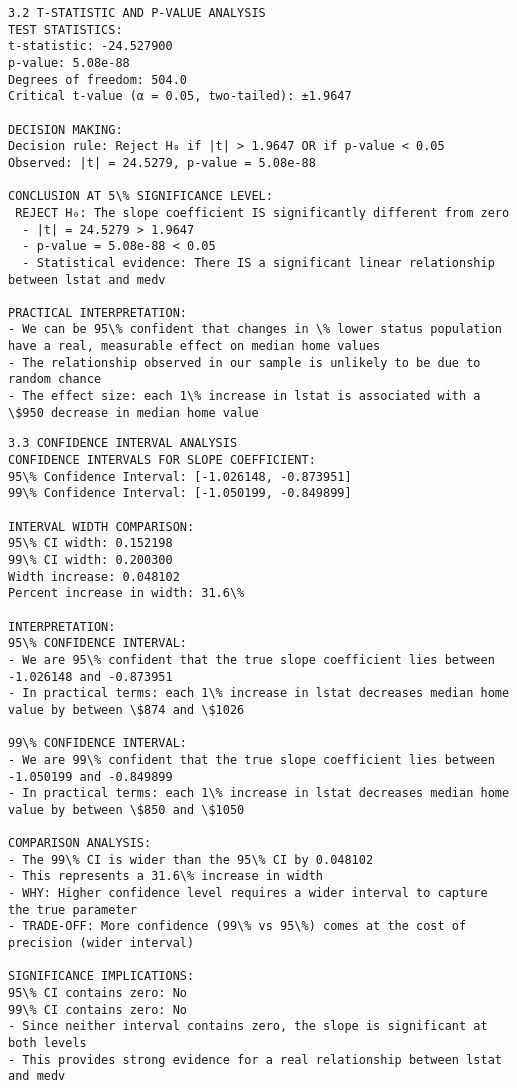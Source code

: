 \documentclass[8pt, twocolumn]{extarticle}
\begin{document}
    \begin{Verbatim}[commandchars=\\\{\}]
3.2 T-STATISTIC AND P-VALUE ANALYSIS
TEST STATISTICS:
t-statistic: -24.527900
p-value: 5.08e-88
Degrees of freedom: 504.0
Critical t-value (α = 0.05, two-tailed): ±1.9647

DECISION MAKING:
Decision rule: Reject H₀ if |t| > 1.9647 OR if p-value < 0.05
Observed: |t| = 24.5279, p-value = 5.08e-88

CONCLUSION AT 5\% SIGNIFICANCE LEVEL:
 REJECT H₀: The slope coefficient IS significantly different from zero
  - |t| = 24.5279 > 1.9647
  - p-value = 5.08e-88 < 0.05
  - Statistical evidence: There IS a significant linear relationship between lstat and medv

PRACTICAL INTERPRETATION:
- We can be 95\% confident that changes in \% lower status population have a real, measurable effect on median home values
- The relationship observed in our sample is unlikely to be due to random chance
- The effect size: each 1\% increase in lstat is associated with a \$950 decrease in median home value
    \end{Verbatim}

    \begin{Verbatim}[commandchars=\\\{\}]
3.3 CONFIDENCE INTERVAL ANALYSIS
CONFIDENCE INTERVALS FOR SLOPE COEFFICIENT:
95\% Confidence Interval: [-1.026148, -0.873951]
99\% Confidence Interval: [-1.050199, -0.849899]

INTERVAL WIDTH COMPARISON:
95\% CI width: 0.152198
99\% CI width: 0.200300
Width increase: 0.048102
Percent increase in width: 31.6\%

INTERPRETATION:
95\% CONFIDENCE INTERVAL:
- We are 95\% confident that the true slope coefficient lies between -1.026148 and -0.873951
- In practical terms: each 1\% increase in lstat decreases median home value by between \$874 and \$1026

99\% CONFIDENCE INTERVAL:
- We are 99\% confident that the true slope coefficient lies between -1.050199 and -0.849899
- In practical terms: each 1\% increase in lstat decreases median home value by between \$850 and \$1050

COMPARISON ANALYSIS:
- The 99\% CI is wider than the 95\% CI by 0.048102
- This represents a 31.6\% increase in width
- WHY: Higher confidence level requires a wider interval to capture the true parameter
- TRADE-OFF: More confidence (99\% vs 95\%) comes at the cost of precision (wider interval)

SIGNIFICANCE IMPLICATIONS:
95\% CI contains zero: No
99\% CI contains zero: No
- Since neither interval contains zero, the slope is significant at both levels
- This provides strong evidence for a real relationship between lstat and medv
    \end{Verbatim}
\end{document}

